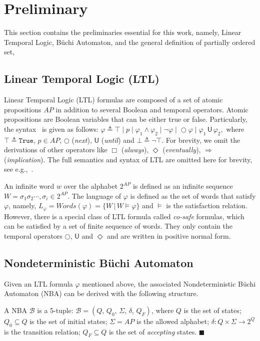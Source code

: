 \section{Preliminary}\label{sec:preliminary}
This section contains the preliminaries essential for this work,
namely, Linear Temporal Logic, B\"uchi Automaton,
and the general definition of partially ordered set,
\subsection{Linear Temporal Logic (LTL)}\label{subsec:LTL}
Linear Temporal Logic (LTL) formulas are composed of a set of atomic propositions $AP$
in addition to several Boolean and temporal operators. Atomic propositions are Boolean variables that can
be either true or false.  Particularly, the syntax~\cite{baier2008principles} is given as follows:
$\varphi \triangleq \top \;|\; p  \;|\; \varphi_1 \wedge \varphi_2  \;|\; \neg \varphi  \;|\; \bigcirc \varphi  \;|\;  \varphi_1 \,\textsf{U}\, \varphi_2,$
where $\top\triangleq \texttt{True}$, $p \in AP$, $\bigcirc$ (\emph{next}),
$\textsf{U}$ (\emph{until}) and $\bot\triangleq \neg \top$.
For brevity, we omit the derivations of other operators like $\Box$ (\emph{always}),
 $\Diamond$ (\emph{eventually}), $\Rightarrow$ (\emph{implication}).
The full semantics and syntax of LTL are omitted here for brevity,
see e.g.,~\cite{baier2008principles}.

An infinite {word} $w$ over the alphabet $2^{AP}$ is defined as an
infinite sequence $W=\sigma_1\sigma_2\cdots, \sigma_i\in 2^{AP}$.
The language of $\varphi$ is defined as the set of words that satisfy $\varphi$,
namely, $L_\varphi=Words(\varphi)=\{W\,|\,W\models\varphi\}$ and $\models$ is the satisfaction relation.
However, there is a special class of LTL formula called \emph{co-safe} formulas,
which can be satisfied by a set of finite sequence of words.
They only contain the temporal operators $\bigcirc$, $\textsf{U}$ and $\Diamond$
 and are written in positive normal form.

\subsection{Nondeterministic B\"uchi Automaton}\label{subsec:nba}

Given an LTL formula $\varphi$ mentioned above, the associated Nondeterministic B\"{u}chi Automaton (NBA) can be derived with the following structure.
\begin{definition}[NBA] \label{def:nba}
A NBA $\mathcal{B}$ is a 5-tuple: $\mathcal{B}=(Q,\,Q_0,\,\Sigma,\,\delta,\,Q_F)$,
where $Q$ is the set of states;
$Q_0\subseteq Q$ is the set of initial states;
$\Sigma=AP$ is the allowed alphabet;
$\delta:Q\times \Sigma\rightarrow2^{Q}$ is the transition relation;
$Q_F\subseteq Q$ is the set of \emph{accepting} states. \hfill $\blacksquare$
\end{definition}

